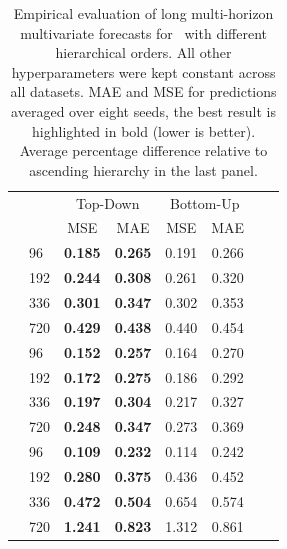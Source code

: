 \begin{table}[ht!] %
\scriptsize
    \begin{center}
    \caption{Empirical evaluation of long multi-horizon multivariate forecasts for \ours\ with different hierarchical orders. All other hyperparameters were kept constant across all datasets. MAE and MSE for predictions averaged over eight seeds, the best result is highlighted in bold (lower is better). Average percentage difference relative to ascending hierarchy in the last panel.}
    \label{table:ablation_hierarchy_order}
	\begin{tabular}{ll | cccccc} \toprule
    						        &     & \multicolumn{2}{c}{Top-Down}       & \multicolumn{2}{c}{Bottom-Up} \\
    						        &     & MSE             & MAE              & MSE            & MAE          \\ \midrule
\parbox[t]{1mm}{}
									& 96  & \textbf{0.185}  & \textbf{0.265}   & 0.191          & 0.266        \\
									& 192 & \textbf{0.244}  & \textbf{0.308}   & 0.261          & 0.320        \\
									& 336 & \textbf{0.301}  & \textbf{0.347}   & 0.302          & 0.353        \\
									& 720 & \textbf{0.429}  & \textbf{0.438}   & 0.440          & 0.454        \\ \midrule
\parbox[t]{1mm}{}
									& 96  & \textbf{0.152} & \textbf{0.257}    & 0.164          & 0.270        \\
									& 192 & \textbf{0.172} & \textbf{0.275}    & 0.186          & 0.292        \\
									& 336 & \textbf{0.197} & \textbf{0.304}    & 0.217          & 0.327        \\
									& 720 & \textbf{0.248} & \textbf{0.347}    & 0.273          & 0.369        \\ \midrule
\parbox[t]{1mm}{}
									& 96  & \textbf{0.109} & \textbf{0.232}    & 0.114          & 0.242        \\
									& 192 & \textbf{0.280} & \textbf{0.375}    & 0.436          & 0.452        \\
									& 336 & \textbf{0.472} & \textbf{0.504}    & 0.654          & 0.574        \\
									& 720 & \textbf{1.241} & \textbf{0.823}    & 1.312          & 0.861        \\ \midrule

\end{tabular}
\end{center}
\end{table}
